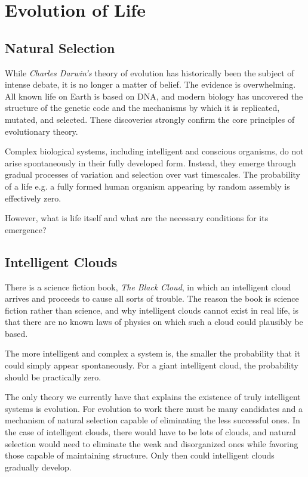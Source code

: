 \chapter{Evolution of Life}
\label{chap:evoluton-of-life}

\section{Natural Selection}

While \textit{Charles Darwin's} theory of evolution has historically been the subject of intense debate, it is no longer a matter of belief. The evidence is overwhelming.
All known life on Earth is based on DNA, and modern biology has uncovered the structure of the genetic code and the mechanisms by which it is replicated, mutated, and selected.
These discoveries strongly confirm the core principles of evolutionary theory.

Complex biological systems, including intelligent and conscious organisms, do not arise spontaneously in their fully developed form.
Instead, they emerge through gradual processes of variation and selection over vast timescales.
The probability of a life e.g. a fully formed human organism appearing by random assembly is effectively zero.

However, what is life itself and what are the necessary conditions for its emergence?


\section*{Intelligent Clouds}

There is a science fiction book, \emph{The Black Cloud},
in which an intelligent cloud arrives and proceeds to cause all sorts
of trouble. The reason the book is science fiction rather than science,
and why intelligent clouds cannot exist in real life, is that there are
no known laws of physics on which such a cloud could plausibly be based.

The more intelligent and complex a system is, the smaller the
probability that it could simply appear spontaneously. For a giant
intelligent cloud, the probability should be practically zero.

The only theory we currently have that explains the existence of
truly intelligent systems is evolution. For evolution to work there
must be many candidates and a mechanism of natural selection capable
of eliminating the less successful ones. In the case of intelligent
clouds, there would have to be lots of clouds, and natural selection
would need to eliminate the weak and disorganized ones while favoring
those capable of maintaining structure. Only then could intelligent
clouds gradually develop.

